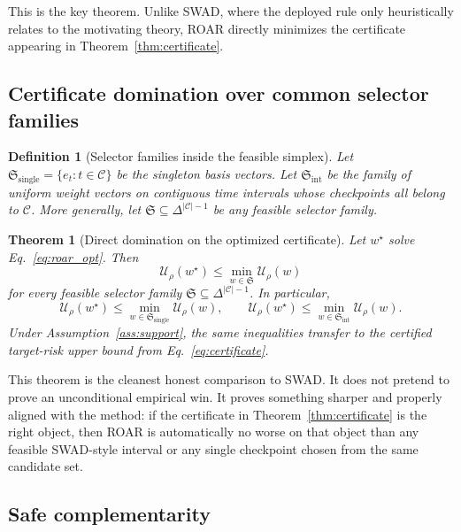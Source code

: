 \documentclass{article}
\newtheorem{theorem}{Theorem}
\newtheorem{definition}{Definition}
\newcommand{\cC}{\mathcal{C}}
\newcommand{\simplex}{\Delta}
\newcommand{\roar}{\textup{\textsc{ROAR}}}
\newcommand{\swad}{\textup{\textsc{SWAD}}}
\begin{document}
This is the key theorem. Unlike \swad{}, where the deployed rule only heuristically relates to the motivating theory, \roar{} directly minimizes the certificate appearing in Theorem~\ref{thm:certificate}.

\subsection{Certificate domination over common selector families}

\begin{definition}[Selector families inside the feasible simplex]
\label{def:families}
Let $\mathfrak S_{\mathrm{single}}=\{e_t:t\in\cC\}$ be the singleton basis vectors. Let $\mathfrak S_{\mathrm{int}}$ be the family of uniform weight vectors on contiguous time intervals whose checkpoints all belong to $\cC$. More generally, let $\mathfrak S\subseteq \simplex^{|\cC|-1}$ be any feasible selector family.
\end{definition}

\begin{theorem}[Direct domination on the optimized certificate]
\label{thm:domination}
Let $w^{\star}$ solve Eq.~\eqref{eq:roar_opt}. Then
\begin{equation}
    \mathcal U_{\rho}(w^{\star})
    \le
    \min_{w\in\mathfrak S}\mathcal U_{\rho}(w)
    \label{eq:domination}
\end{equation}
for every feasible selector family $\mathfrak S\subseteq \simplex^{|\cC|-1}$. In particular,
\[
    \mathcal U_{\rho}(w^{\star})
    \le
    \min_{w\in\mathfrak S_{\mathrm{single}}}\mathcal U_{\rho}(w),
    \qquad
    \mathcal U_{\rho}(w^{\star})
    \le
    \min_{w\in\mathfrak S_{\mathrm{int}}}\mathcal U_{\rho}(w).
\]
Under Assumption~\ref{ass:support}, the same inequalities transfer to the certified target-risk upper bound from Eq.~\eqref{eq:certificate}.
\end{theorem}

This theorem is the cleanest honest comparison to \swad{}. It does not pretend to prove an unconditional empirical win. It proves something sharper and properly aligned with the method: if the certificate in Theorem~\ref{thm:certificate} is the right object, then \roar{} is automatically no worse on that object than any feasible \swad{}-style interval or any single checkpoint chosen from the same candidate set.

\subsection{Safe complementarity}
\end{document}
